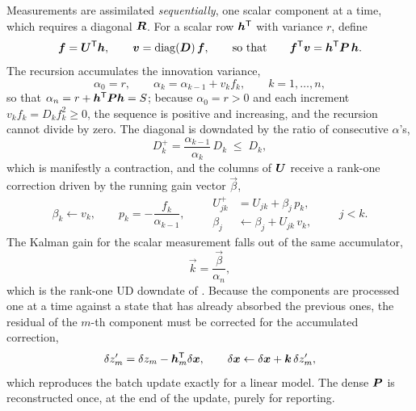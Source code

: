 Measurements are assimilated \emph{sequentially}, one scalar component at a
time, which requires a diagonal $\bm{R}$. For a scalar row
$\bm{h}^{\mathsf{T}}$ with variance $r$, define
\begin{equation}
  \label{eq:flt-udu-carlson-f}
  \bm{f} = \bm{U}^{\mathsf{T}} \bm{h},
  \qquad
  \bm{v} = \operatorname{diag}(\bm{D})\,\bm{f},
  \qquad\text{so that}\qquad
  \bm{f}^{\mathsf{T}} \bm{v} = \bm{h}^{\mathsf{T}} \bm{P}\,\bm{h} .
\end{equation}
The recursion accumulates the innovation variance,
\begin{equation}
  \label{eq:flt-udu-alpha}
  \alpha_0 = r,
  \qquad
  \alpha_k = \alpha_{k-1} + v_k f_k,
  \qquad k = 1, \dots, n ,
\end{equation}
so that $\alpha_n = r + \bm{h}^{\mathsf{T}}\bm{P}\bm{h} = S$; because
$\alpha_0 = r > 0$ and each increment $v_k f_k = D_k f_k^2 \geq 0$, the
sequence is positive and increasing, and the recursion cannot divide by zero.
The diagonal is downdated by the ratio of consecutive $\alpha$'s,
\begin{equation}
  \label{eq:flt-udu-d}
  D^{+}_k = \frac{\alpha_{k-1}}{\alpha_k}\,D_k \;\leq\; D_k ,
\end{equation}
which is manifestly a contraction, and the columns of $\bm{U}$ receive a
rank-one correction driven by the running gain vector $\vec{\beta}$,
\begin{equation}
  \label{eq:flt-udu-u}
  \beta_k \leftarrow v_k,
  \qquad
  p_k = -\frac{f_k}{\alpha_{k-1}},
  \qquad
  \begin{aligned}
    U^{+}_{jk} &= U_{jk} + \beta_j\,p_k, \\
    \beta_j    &\leftarrow \beta_j + U_{jk}\,v_k,
  \end{aligned}
  \qquad j < k .
\end{equation}
The Kalman gain for the scalar measurement falls out of the same accumulator,
\begin{equation}
  \label{eq:flt-udu-gain}
  \vec{k} = \frac{\vec{\beta}}{\alpha_n} ,
\end{equation}
which is the rank-one UD downdate of
\citep[Ch.~6.2.3, Eqs.~6.24--6.27, Algorithm~2]{iiyama2026thesis}. Because the
components are processed one at a time against a state that has already
absorbed the previous ones, the residual of the $m$-th component must be
corrected for the accumulated correction,
\begin{equation}
  \label{eq:flt-udu-residual}
  \delta z_m' = \delta z_m - \bm{h}_m^{\mathsf{T}} \delta \bm{x},
  \qquad
  \delta \bm{x} \leftarrow \delta \bm{x} + \bm{k}\,\delta z_m' ,
\end{equation}
which reproduces the batch update exactly for a linear model. The dense
$\bm{P}$ is reconstructed once, at the end of the update, purely for
reporting.


